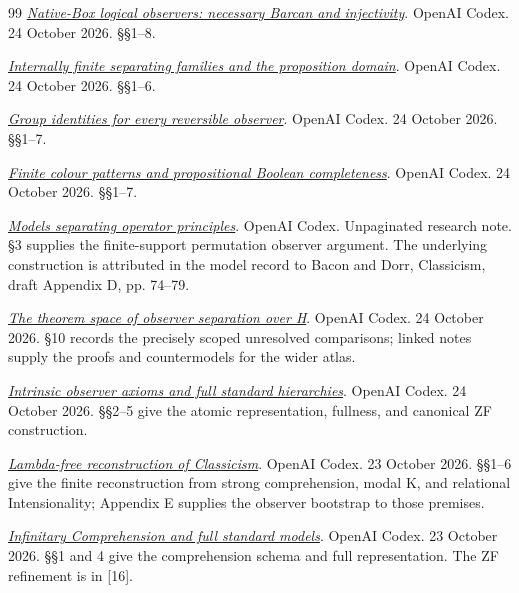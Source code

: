 \documentclass[12pt,letterpaper]{article}
\begin{document}
\begin{thebibliography}{99}
\label{ref:10}
\emph{\href{run:../proofs/h-observer-space/native-box-logical-observers.md}{Native-Box logical observers: necessary Barcan and injectivity}}. OpenAI Codex. 24 October 2026. \S\S1--8.

\label{ref:11}
\emph{\href{run:../proofs/h-observer-space/internally-finite-observer-families.md}{Internally finite separating families and the proposition domain}}. OpenAI Codex. 24 October 2026. \S\S1--6.

\label{ref:12}
\emph{\href{run:../proofs/h-observer-space/group-identities-reversible-observers.md}{Group identities for every reversible observer}}. OpenAI Codex. 24 October 2026. \S\S1--7.

\label{ref:13}
\emph{\href{run:../proofs/h-observer-space/finite-colour-propositional-completeness.md}{Finite colour patterns and propositional Boolean completeness}}. OpenAI Codex. 24 October 2026. \S\S1--7.

\label{ref:14}
\emph{\href{run:../proofs/observer-models.md}{Models separating operator principles}}. OpenAI Codex. Unpaginated research note. \S3 supplies the finite-support permutation observer argument. The underlying construction is attributed in the model record to Bacon and Dorr, Classicism, draft Appendix D, pp. 74--79.

\label{ref:15}
\emph{\href{run:../proofs/h-observer-space/MAP.md}{The theorem space of observer separation over H}}. OpenAI Codex. 24 October 2026. \S10 records the precisely scoped unresolved comparisons; linked notes supply the proofs and countermodels for the wider atlas.

\label{ref:16}
\emph{\href{run:../proofs/intrinsic-observer-axioms.md}{Intrinsic observer axioms and full standard hierarchies}}. OpenAI Codex. 24 October 2026. \S\S2--5 give the atomic representation, fullness, and canonical ZF construction.

\label{ref:17}
\emph{\href{run:../proofs/lambda-free-reconstruction.md}{Lambda-free reconstruction of Classicism}}. OpenAI Codex. 23 October 2026. \S\S1--6 give the finite reconstruction from strong comprehension, modal K, and relational Intensionality; Appendix E supplies the observer bootstrap to those premises.

\label{ref:18}
\emph{\href{run:../proofs/infinitary-comprehension.md}{Infinitary Comprehension and full standard models}}. OpenAI Codex. 23 October 2026. \S\S1 and 4 give the comprehension schema and full representation. The ZF refinement is in [16].

\end{thebibliography}
\end{document}
